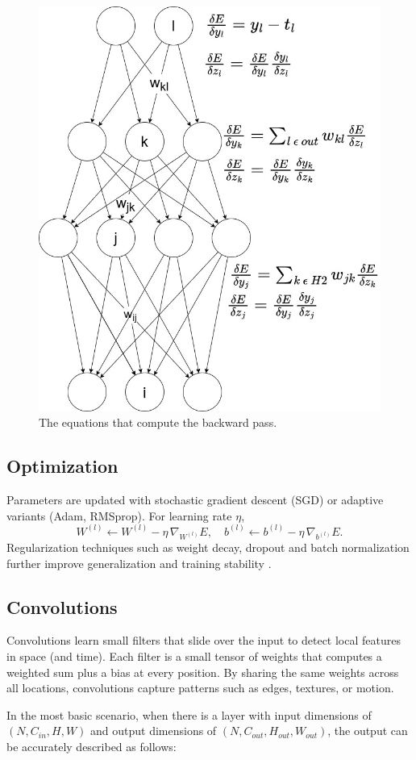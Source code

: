 \begin{figure}[ht]
    \centering
    \includegraphics[width=0.6\linewidth]{figures/neural_net_back_prop.jpg}
    \caption{The equations that compute the backward pass.} 
    \label{fig:backward_pass}
\end{figure}

\subsection{Optimization}
Parameters are updated with stochastic gradient descent (SGD) or adaptive variants (Adam, RMSprop). For learning rate \(\eta\),
\[
W^{(l)} \leftarrow W^{(l)} - \eta\,\nabla_{W^{(l)}}E,
\quad
b^{(l)} \leftarrow b^{(l)} - \eta\,\nabla_{b^{(l)}}E.
\]
Regularization techniques such as weight decay, dropout and batch normalization further improve generalization and training stability \cite{ioffe_batch_2015}.

\subsection{Convolutions}

Convolutions learn small filters that slide over the input to detect local features in space (and time). Each filter is a small tensor of weights that computes a weighted sum plus a bias at every position. By sharing the same weights across all locations, convolutions capture patterns such as edges, textures, or motion.  

In the most basic scenario, when there is a layer with input dimensions of \( (N, C_{in}, H, W)\) and output dimensions of \( (N, C_{out}, H_{out}, W_{out})\), the output can be accurately described as follows:

